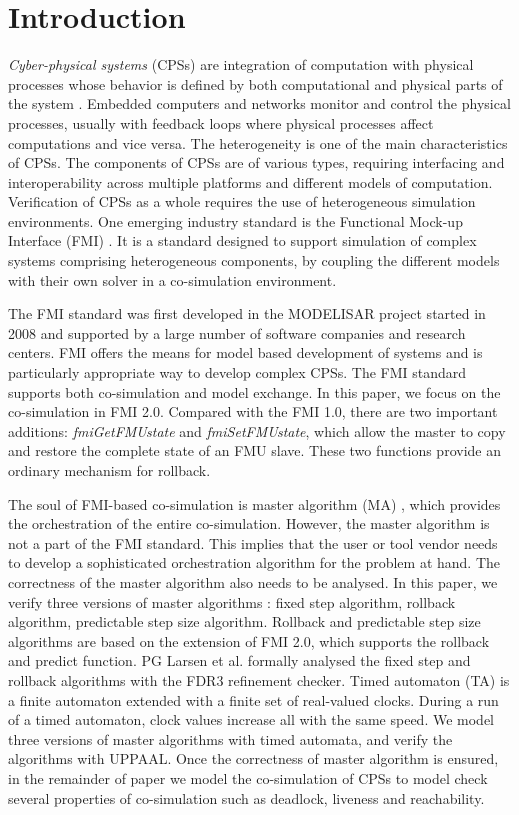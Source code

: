 \section{Introduction}

\textit{Cyber-physical systems} (CPSs)  are integration of computation with physical processes whose behavior is defined by both computational and physical parts of the system \cite{Zanero17}. Embedded computers and networks monitor and control the physical processes, usually with feedback loops where physical processes affect computations and vice versa. The heterogeneity is one of the main characteristics of CPSs. The components of CPSs are of various types, requiring interfacing and interoperability across multiple platforms and different models of computation. Verification of CPSs as a whole requires the use of heterogeneous simulation environments. One emerging industry
standard is the Functional Mock-up Interface (FMI) \cite{Blochwitz2011The}\cite{BromanBGLMTW13}. It
is a standard designed to support simulation of complex systems
comprising heterogeneous components, by coupling the different models with their own solver in a co-simulation environment.

The FMI standard was first developed in the MODELISAR project started in 2008 and supported by a large number of software companies and research centers. FMI offers the means for model based development of systems and is particularly appropriate way to develop complex CPSs. The FMI standard supports both co-simulation and  model exchange. In this paper, we focus on the co-simulation in FMI 2.0.
Compared with the FMI 1.0, there are two important additions: \emph{fmiGetFMUstate} and \emph{fmiSetFMUstate}, which allow the master to copy and restore the complete state of an FMU slave. These two functions provide an ordinary mechanism for rollback. 

The soul of FMI-based co-simulation is master algorithm (MA) \cite{AckerDVM15}, which provides the orchestration of the entire co-simulation. However, the master algorithm is not a part of the FMI standard. This implies that the user or tool vendor needs to develop a sophisticated orchestration algorithm for the problem at hand. The correctness of the master algorithm also needs to be analysed. In this paper, we verify three versions of master algorithms \cite{BromanBGLMTW13}: fixed step algorithm, rollback algorithm, predictable step size algorithm. Rollback and predictable step size algorithms are based on the extension of FMI 2.0, which supports the rollback and predict function. PG Larsen et al. \cite{Larsen2016Integrated} formally analysed the fixed step and rollback algorithms with the FDR3 refinement checker. Timed automaton (TA) \cite{BehrmannDLHPYH06} is a finite automaton extended with a finite set of real-valued clocks. During a run of a timed automaton, clock values increase all with the same speed. We model three versions of master algorithms with timed automata, and verify the algorithms with UPPAAL. Once the correctness of master algorithm is ensured, in the remainder of paper we model the co-simulation of CPSs to model check several properties of co-simulation such as deadlock, liveness and reachability. 


